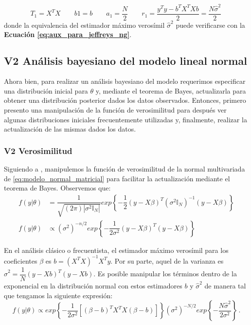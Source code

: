 \begin{equation*}
T_1 = X^TX \qquad b1 = b \qquad a_1 = \dfrac{N}{2} \qquad r_1 = \dfrac{y^Ty - b^TX^TXb}{2}=\dfrac{N\hat{\sigma}^2}{2} \,
\end{equation*}
donde la equivalencia del estimador máximo verosímil $\hat{\sigma}^2$ puede verificarse con la \textbf{Ecuación \ref{eq:aux_para_jeffreys_ng}}.\\

\subsection{V2 Análisis bayesiano del modelo lineal normal}

Ahora bien, para realizar un análisis bayesiano del modelo requerimos especificar una distribución inicial para $\theta$ y, mediante el teorema de Bayes, actualizarla para obtener una distribución posterior dados los datos observados. Entonces, primero presento una manipulación de la función de verosimilitud para después ver algunas distribuciones iniciales frecuentemente utilizadas y, finalmente, realizar la actualización de las mismas dados los datos. 

\subsubsection*{V2 Verosimilitud}

Siguiendo a \textcites{GP98}{Congdon06}, manipulemos la función de verosimilitud de la normal multivariada de \eqref{eq:modelo_normal_matricial} para facilitar la actualización mediante el teorema de Bayes. Observemos que:
\begin{align*}
f(y|\theta) &= \dfrac{1}{\sqrt{(2\pi)|\sigma^2 \mathbb{I}_N|}}exp\left\lbrace -\dfrac{1}{2}(y-X\beta)^T(\sigma^2\mathbb{I}_N)^{-1}(y-X\beta)\right\rbrace \nonumber \\
f(y|\theta) &\propto (\sigma^2)^{-n/2}exp\left\lbrace -\dfrac{1}{2\sigma^2}(y-X\beta)^T(y-X\beta)\right\rbrace
\end{align*}

En el análisis clásico o frecuentista, el estimador máximo verosímil para los coeficientes $\beta$ es $b=(X^TX)^{-1}X^Ty$. Por su parte, aquel de la varianza es $\hat{\sigma}^2=\dfrac{1}{N}(y-Xb)^T(y-Xb)$. Es posible manipular los términos dentro de la exponencial en la distribución normal con estos estimadores $b$ y $\hat{\sigma}^2$ de manera tal que tengamos la siguiente expresión: 
\begin{equation*}
f(y|\theta) \propto exp\left\lbrace -\dfrac{1}{2\sigma^2}\left[(\beta-b)^TX^TX(\beta-b)\right] \right\rbrace (\sigma^2)^{-N/2} exp\left\lbrace -\dfrac{N\hat{\sigma}^2}{2\sigma^2}\right\rbrace \,.
\end{equation*}

